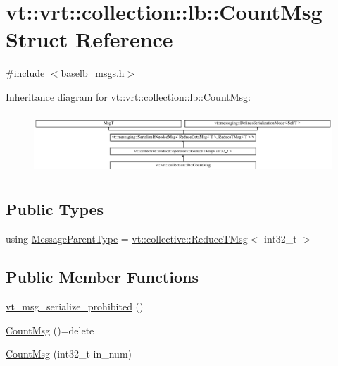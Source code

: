 \hypertarget{structvt_1_1vrt_1_1collection_1_1lb_1_1_count_msg}{}\section{vt\+:\+:vrt\+:\+:collection\+:\+:lb\+:\+:Count\+Msg Struct Reference}
\label{structvt_1_1vrt_1_1collection_1_1lb_1_1_count_msg}


{\ttfamily \#include $<$baselb\+\_\+msgs.\+h$>$}

Inheritance diagram for vt\+:\+:vrt\+:\+:collection\+:\+:lb\+:\+:Count\+Msg\+:\begin{figure}[H]
\begin{center}
\leavevmode
\includegraphics[height=2.299795cm]{structvt_1_1vrt_1_1collection_1_1lb_1_1_count_msg}
\end{center}
\end{figure}
\subsection*{Public Types}
\begin{DoxyCompactItemize}
\item 
using \hyperlink{structvt_1_1vrt_1_1collection_1_1lb_1_1_count_msg_a2eb103bdbba246599e9e4b0796c165a5}{Message\+Parent\+Type} = \hyperlink{namespacevt_1_1collective_a28b82d5d48c9bc6e4fd738fcbf9e0f62}{vt\+::collective\+::\+Reduce\+T\+Msg}$<$ int32\+\_\+t $>$
\end{DoxyCompactItemize}
\subsection*{Public Member Functions}
\begin{DoxyCompactItemize}
\item 
\hyperlink{structvt_1_1vrt_1_1collection_1_1lb_1_1_count_msg_af9895cfdcfee8fd719ff943a469d1540}{vt\+\_\+msg\+\_\+serialize\+\_\+prohibited} ()
\item 
\hyperlink{structvt_1_1vrt_1_1collection_1_1lb_1_1_count_msg_a5a5be6041502d30b0e4edb5681651bee}{Count\+Msg} ()=delete
\item 
\hyperlink{structvt_1_1vrt_1_1collection_1_1lb_1_1_count_msg_ab5f72606b12d09ef4d900c6f79c59ddf}{Count\+Msg} (int32\+\_\+t in\+\_\+num)
\end{DoxyCompactItemize}
